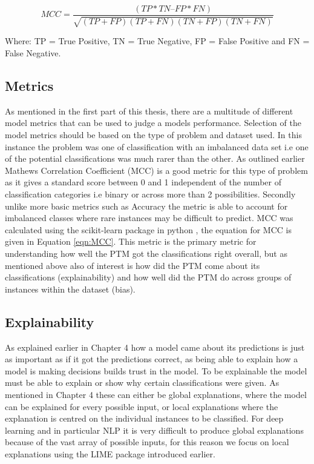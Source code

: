 \begin{equation}
MCC =  \frac{(TP*TN – FP*FN)}{\sqrt{(TP+FP)(TP+FN)(TN+FP)(TN+FN)}}
\label{eqn:MCC}
\end{equation}

Where: TP = True Positive, TN = True Negative, FP = False Positive and FN = False Negative.


\subsection{Metrics} As mentioned in the first part of this thesis, there are a multitude of different model metrics that can be used to judge a models performance. Selection of the model metrics should be based on the type of problem and dataset used. In this instance the problem was one of classification with an imbalanced data set i.e one of the potential classifications was much rarer than the other. As outlined earlier Mathews Correlation Coefficient (MCC) is a good metric for this type of problem as it gives a standard score between 0 and 1 independent of the number of classification categories i.e binary or across more than 2 possibilities. Secondly unlike more basic metrics such as Accuracy the metric is able to account for imbalanced classes where rare instances may be difficult to predict. MCC was calculated using the scikit-learn package in python \parencite{scikit-learn}, the equation for MCC is given in Equation \ref{eqn:MCC}. This metric is the primary metric for understanding how well the PTM got the classifications right overall, but as mentioned above also of interest is how did the PTM come about its classifications (explainability) and how well did the PTM do across groups of instances within the dataset (bias). 


\subsection{Explainability}As explained earlier in Chapter 4 how a model came about its predictions is just as important as if it got the predictions correct, as being able to explain how a model is making decisions builds trust in the model. To be explainable the model must be able to explain or show why certain classifications were given. As mentioned in Chapter 4 these can either be global explanations, where the model can be explained for every possible input, or local explanations where the explanation is centred on the individual instances to be classified. For deep learning and in particular NLP it is very difficult to produce global explanations because of the vast array of possible inputs, for this reason we focus on local explanations using the LIME package introduced earlier. 

